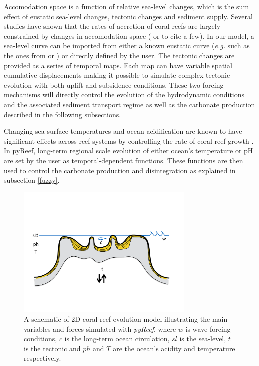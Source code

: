 \documentclass[default,jgrga]{agutex2015}
\begin{document}
\begin{article}
\noindent Accomodation space is a function of relative sea-level changes, which is the sum effect of eustatic sea-level changes, tectonic changes and sediment supply. Several studies have shown that the rates of accretion of coral reefs are largely constrained by changes in accomodation space (\citet{VanWoesik15} or \citet{Roff15} to cite a few). In our model, a sea-level curve can be imported from either a known eustatic curve (\textit{e.g.} such as the ones from \citet{Haq87} or \citet{Miller05}) or directly defined by the user. The tectonic changes are provided as a series of temporal maps. Each map can have variable spatial cumulative displacements making it possible to simulate complex tectonic evolution with both uplift and subsidence conditions. These two forcing mechanisms will directly control the evolution of the hydrodynamic conditions and the associated sediment transport regime as well as the carbonate production described in the following subsections.

\noindent Changing sea surface temperatures and ocean acidification are known to have significant effects across reef systems by controlling the rate of coral reef growth \citep{Shaw12, Andersson13, Zhang13}. In pyReef, long-term regional scale evolution of either ocean's temperature or pH are set by the user as temporal-dependent functions. These functions are then used to control the carbonate production and disintegration as explained in subsection \ref{fuzzy}.

\begin{figure}
\centering
\noindent\includegraphics[width=20pc]{figs/fig1.pdf}
\caption{A schematic of 2D coral reef evolution model illustrating the main variables and forces simulated with \textit{pyReef}, where $w$ is wave forcing conditions, $c$ is the long-term ocean circulation, $sl$ is the sea-level, $t$ is the tectonic and $ph$ and $T$ are the ocean's acidity and temperature respectively.
}
\label{pyreef_sketch}
\end{figure}


\end{article}
\end{document}
